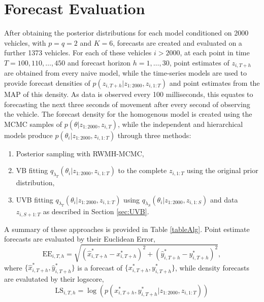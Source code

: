 \documentclass[12pt,a4paper]{article}\usepackage[]{graphicx}\usepackage[]{color}
\begin{document}
\section{Forecast Evaluation}
\label{sec:eval}

After obtaining the posterior distributions for each model conditioned on 2000 vehicles, with $p = q = 2$ and $K = 6$, forecasts are created and evaluated on a further 1373 vehicles. For each of these vehicles $i > 2000$, at each point in time $T = 100, 110, \dots, 450$ and forecast horizon $h = 1, \dots, 30$, point estimates of $z_{i, T+h}$ are obtained from every naive model, while the time-series models are used to provide forecast densities of $p(z_{i, T+h} | z_{1:2000}, z_{i, 1:T})$ and point estimates from the MAP of this density. As data is observed every 100 milliseconds, this equates to forecasting the next three seconds of movement after every second of observing the vehicle. The forecast density for the homogenous model is created using the MCMC samples of $p(\theta | z_{1:2000}, z_{i, T})$, while the independent and hierarchical models produce $p(\theta_{i} | z_{1:2000}, z_{i, 1:T})$ through three methods:
\begin{enumerate}
\item Posterior sampling with RWMH-MCMC,
\item VB fitting $q_{\lambda_T}(\theta_{i} | z_{1:2000}, z_{i, 1:T})$ to the complete $z_{i, 1:T}$ using the original prior distribution,
\item UVB fitting $q_{\lambda_T}(\theta_{i} | z_{1:2000}, z_{i, 1:T})$ using $q_{\lambda_S}(\theta_{i} | z_{1:2000}, z_{i, 1:S})$ and data $z_{i, S+1:T}$ as described in Section \ref{sec:UVB}.
\end{enumerate}
A summary of these approaches is provided in Table \ref{tableAlg}. Point estimate forecasts are evaluated by their Euclidean Error,
\begin{equation}
\mbox{EE}_{i, T, h} = \sqrt{\left(\hat{x}^*_{i, T+h} - x^*_{i, T+h} \right)^2 + \left(\hat{y}^*_{i, T+h} - y^*_{i, T+h} \right)^2},
\label{eucError}
\end{equation}
where $\{\hat{x}^*_{i, T+h}, \hat{y}^*_{i, T+h}\}$ is a forecast of $\{x^*_{i, T+h}, y^*_{i, T+h}\}$, while density forecasts are evalutated by their logscore,
\begin{equation}
\mbox{LS}_{i, T, h} = \log \left(p\left(x^*_{i, T+h}, y^*_{i, T+h} | z_{1:2000}, z_{i, 1:T} \right) \right)
\label{logscore}
\end{equation}
\end{document}
